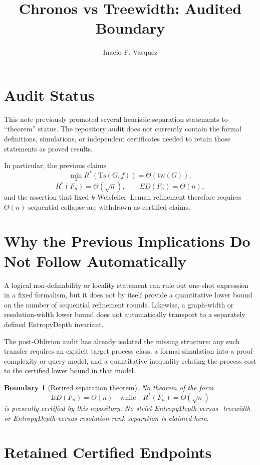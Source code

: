 \documentclass[11pt]{article}
\title{Chronos vs Treewidth: Audited Boundary}
\author{Inacio F. Vasquez}
\date{}
\newtheorem{boundary}{Boundary}
\begin{document}
\maketitle

\section{Audit Status}

This note previously promoted several heuristic separation statements to
``theorem'' status.  The repository audit does not currently contain the
formal definitions, simulations, or independent certificates needed to retain
those statements as proved results.

In particular, the previous claims
\[
\min_\pi R^*(\mathrm{Ts}(G,f))=\Theta(\mathrm{tw}(G)),
\]
\[
R^*(F_n)=\Theta(\sqrt n),
\qquad
ED(F_n)=\Theta(n),
\]
and the assertion that fixed-$k$ Weisfeiler--Leman refinement therefore
requires $\Theta(n)$ sequential collapse are withdrawn as certified claims.

\section{Why the Previous Implications Do Not Follow Automatically}

A logical non-definability or locality statement can rule out one-shot
expression in a fixed formalism, but it does not by itself provide a
quantitative lower bound on the number of sequential refinement rounds.
Likewise, a graph-width or resolution-width lower bound does not automatically
transport to a separately defined EntropyDepth invariant.

The post-Oblivion audit has already isolated the missing structure: any such
transfer requires an explicit target process class, a formal simulation into a
proof-complexity or query model, and a quantitative inequality relating the
process cost to the certified lower bound in that model.

\begin{boundary}[Retired separation theorem]
No theorem of the form
\[
ED(F_n)=\Theta(n)
\quad\text{while}\quad
R^*(F_n)=\Theta(\sqrt n)
\]
is presently certified by this repository.  No strict EntropyDepth-versus-
treewidth or EntropyDepth-versus-resolution-rank separation is claimed here.
\end{boundary}

\section{Retained Certified Endpoints}
\end{document}
